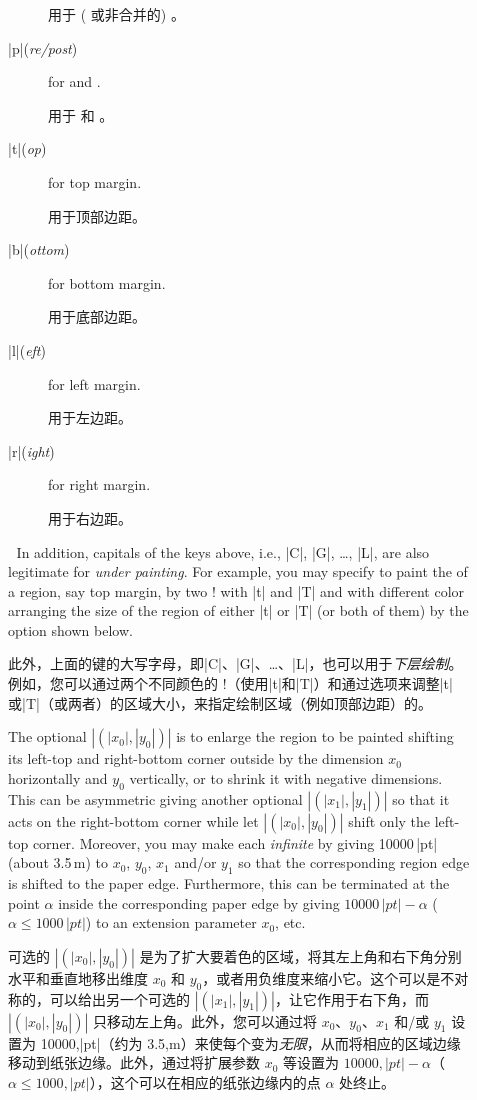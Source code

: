 \begin{description}
\begin{description}
用于 (\mgfnote{} 或非合并的) \Scfnote{}。
\item[|p|\rm(\textit{re/post})] for \Preenv{} and \postenv.

用于 \Preenv{} 和 \postenv。
\item[|t|\rm(\textit{op})] for top margin.

用于顶部边距。
\item[|b|\rm(\textit{ottom})] for bottom margin.

用于底部边距。
\item[|l|\rm(\textit{eft})] for left margin.

用于左边距。
\item[|r|\rm(\textit{ight})] for right margin.

用于右边距。
\end{description}

In addition, capitals of the keys above, i.e., |C|, |G|, \ldots, |L|, are
also legitimate for {\em under painting}.  For example, you may specify to
paint the \bground{} of a region, say top margin, by two
\!\backgroundcolor! with |t| and |T| and with different color arranging the
size of the region of either |t| or |T| (or both of them) by the
\emph{\bgext} option shown below.

此外，上面的键的大写字母，即|C|、|G|、\ldots、|L|，也可以用于{\em 下层绘制}。例如，您可以通过两个不同颜色的 \!\backgroundcolor!（使用|t|和|T|）和通过\emph{\bgext}选项来调整|t|或|T|（或两者）的区域大小，来指定绘制区域（例如顶部边距）的\bground{}。

The optional $|(|x_0|,|y_0|)|$ is to enlarge the region to be painted
shifting its left-top and right-bottom corner outside by
the dimension $x_0$ horizontally and $y_0$ vertically, or to shrink it
with negative dimensions.  This {\em\Uidx\bgext} can be asymmetric giving
another optional $|(|x_1|,|y_1|)|$ so that it acts on the right-bottom
corner while let $|(|x_0|,|y_0|)|$ shift only the left-top corner.
Moreover, you may make each \bgext{} {\em infinite} by giving 10000\,|pt|
(about 3.5\,m) to $x_0$, $y_0$, $x_1$ and/or $y_1$ so that the
corresponding region edge is shifted to the paper edge.  Furthermore, this
{\em\Uidx\bginfext{}} can be terminated at the point $\alpha$ inside the
corresponding paper edge by giving $10000\,|pt|-\alpha$
($\alpha\leq1000\,|pt|$) to an extension parameter $x_0$, etc.

可选的 $|(|x_0|,|y_0|)|$ 是为了扩大要着色的区域，将其左上角和右下角分别水平和垂直地移出维度 $x_0$ 和 $y_0$，或者用负维度来缩小它。这个{\em\Uidx\bgext}可以是不对称的，可以给出另一个可选的 $|(|x_1|,|y_1|)|$，让它作用于右下角，而 $|(|x_0|,|y_0|)|$ 只移动左上角。此外，您可以通过将 $x_0$、$y_0$、$x_1$ 和/或 $y_1$ 设置为 10000,|pt|（约为 3.5,m）来使每个\bgext{}变为{\em 无限}，从而将相应的区域边缘移动到纸张边缘。此外，通过将扩展参数 $x_0$ 等设置为 $10000,|pt|-\alpha$（$\alpha\leq1000,|pt|$），这个{\em\Uidx\bginfext{}}可以在相应的纸张边缘内的点 $\alpha$ 处终止。


\end{description}
